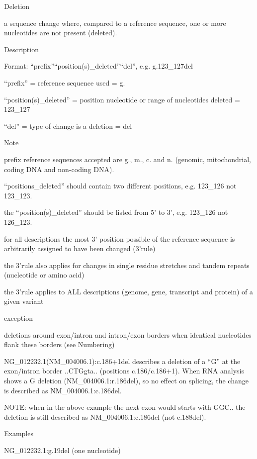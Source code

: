 \documentclass{book}
\begin{document}
	Deletion

	a sequence change where, compared to a reference sequence, one or more nucleotides are not present (deleted).

	

	

	Description

	Format: “prefix”“position(s)\_deleted”“del”, e.g. g.123\_127del

	“prefix” = reference sequence used = g.

	“position(s)\_deleted” = position nucleotide or range of nucleotides deleted = 123\_127

	“del” = type of change is a deletion = del

	

	Note

	prefix reference sequences accepted are g., m., c. and n. (genomic, mitochondrial, coding DNA and non-coding DNA).

	“positions\_deleted” should contain two different positions, e.g. 123\_126 not 123\_123.

	the “position(s)\_deleted” should be listed from 5’ to 3’, e.g. 123\_126 not 126\_123.

	for all descriptions the most 3’ position possible of the reference sequence is arbitrarily assigned to have been changed (3’rule) 

	the 3’rule also applies for changes in single residue stretches and tandem repeats (nucleotide or amino acid)

	the 3’rule applies to ALL descriptions (genome, gene, transcript and protein) of a given variant

	exception

	deletions around exon/intron and intron/exon borders when identical nucleotides flank these borders (see Numbering)

	NG\_012232.1(NM\_004006.1):c.186+1del describes a deletion of a “G” at the exon/intron border ..CTGgta.. (positions c.186/c.186+1). When RNA analysis shows a G deletion (NM\_004006.1:r.186del), so no effect on splicing, the change is described as NM\_004006.1:c.186del.

	NOTE: when in the above example the next exon would starts with GGC.. the deletion is still described as NM\_004006.1:c.186del (not c.188del).

	

	

	Examples

	NG\_012232.1:g.19del (one nucleotide)
\end{document}
